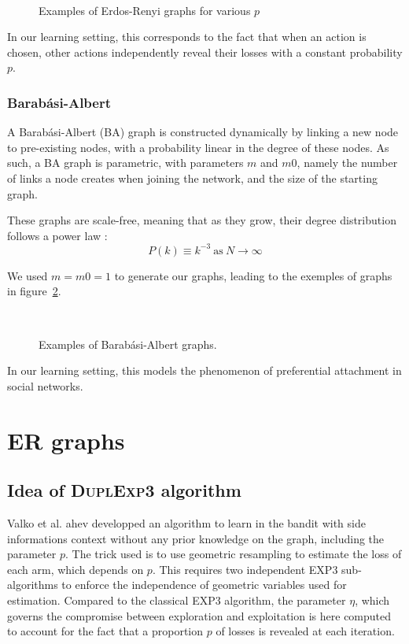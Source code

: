 \documentclass[10pt,a4paper]{scrartcl}
\begin{document}
\begin{figure}
 ~
 \label{er_ex}
 \caption{Examples of Erdos-Renyi graphs for various $p$}
\end{figure}

In our learning setting, this corresponds to the fact that when an action is chosen, other actions independently reveal their losses with a constant probability $p$.

\subsubsection{Barabási-Albert}
A Barabási-Albert (BA) graph is constructed dynamically by linking a new node to pre-existing nodes, with a probability linear in the degree of these nodes. As such, a BA graph is parametric, with parameters $m$ and $m0$, namely the number of links a node creates when joining the network, and the size of the starting graph.

These graphs are scale-free, meaning that as they grow, their degree distribution follows a power law :
$$P(k) \equiv k^{-3}~\text{as}~N\rightarrow \infty$$

We used $m=m0=1$ to generate our graphs, leading to the exemples of graphs in figure~\ref{ba_ex}.

\begin{figure}
 ~
 \label{ba_ex}
 \caption{Examples of Barabási-Albert graphs.}
\end{figure}

In our learning setting, this models the phenomenon of preferential attachment in social networks.

\section{ER graphs}
\subsection{Idea of \textsc{DuplExp3} algorithm}
Valko et al. ahev developped an algorithm to learn in the bandit with side informations context without any prior knowledge on the graph, including the parameter $p$. The trick used is to use geometric resampling to estimate the loss of each arm, which depends on $p$. This requires two independent EXP3 sub-algorithms to enforce the independence of geometric variables used for estimation. Compared to the classical EXP3 algorithm, the parameter $\eta$, which governs the compromise between exploration and exploitation is here computed to account for the fact that a proportion $p$ of losses is revealed at each iteration.
\end{document}
